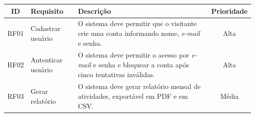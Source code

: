 \begin{quadro}[htbp]
\begin{ilustracao}{\caption{Requisitos funcionais do sistema (exemplo)}\label{qua:guia-requisitos}}{\elaboracaopropria}
  \renewcommand{\arraystretch}{1.25}
  \begin{tabularx}{\textwidth}{|c|>{\raggedright\arraybackslash}p{3.6cm}|X|c|}
    \hline
    \textbf{ID} & \textbf{Requisito} & \textbf{Descrição} & \textbf{Prioridade} \\
    \hline
    RF01 & Cadastrar usuário & O sistema deve permitir que o visitante crie uma conta informando nome, \emph{e-mail} e senha. & Alta \\
    \hline
    RF02 & Autenticar usuário & O sistema deve permitir o acesso por \emph{e-mail} e senha e bloquear a conta após cinco tentativas inválidas. & Alta \\
    \hline
    RF03 & Gerar relatório & O sistema deve gerar relatório mensal de atividades, exportável em PDF e em CSV. & Média \\
    \hline
  \end{tabularx}
\end{ilustracao}
\end{quadro}
